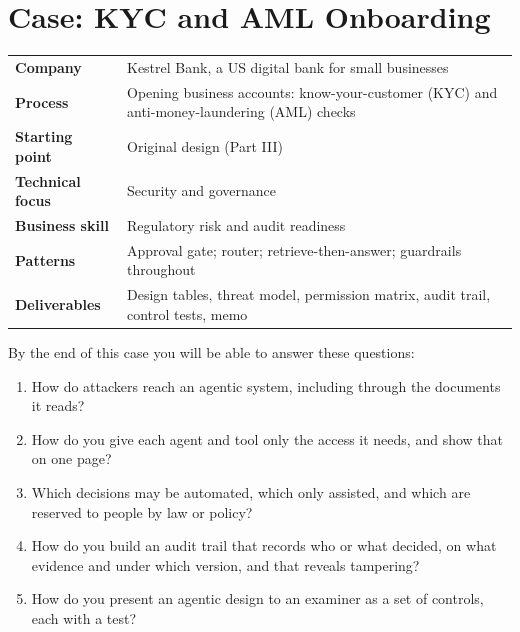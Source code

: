
\chapter{Case: KYC and AML Onboarding}
\label{ch:case-kyc}

\begin{caseglance}
\begin{tabularx}{\linewidth}{@{}>{\bfseries}p{3.4cm}X@{}}
Company & Kestrel Bank, a US digital bank for small businesses \\
Process & Opening business accounts: know-your-customer (KYC) and anti-money-laundering (AML) checks \\
Starting point & Original design (Part III) \\
Technical focus & Security and governance \\
Business skill & Regulatory risk and audit readiness \\
Patterns & Approval gate; router; retrieve-then-answer; guardrails throughout \\
Deliverables & Design tables, threat model, permission matrix, audit trail, control tests, memo
\end{tabularx}
\end{caseglance}

\begin{chapterquestions}
By the end of this case you will be able to answer these questions:
\begin{enumerate}[leftmargin=*,itemsep=2pt]
  \item How do attackers reach an agentic system, including through the documents it reads?
  \item How do you give each agent and tool only the access it needs, and show that on one page?
  \item Which decisions may be automated, which only assisted, and which are reserved to people by law or policy?
  \item How do you build an audit trail that records who or what decided, on what evidence and under which version, and that reveals tampering?
  \item How do you present an agentic design to an examiner as a set of controls, each with a test?
\end{enumerate}
\end{chapterquestions}


